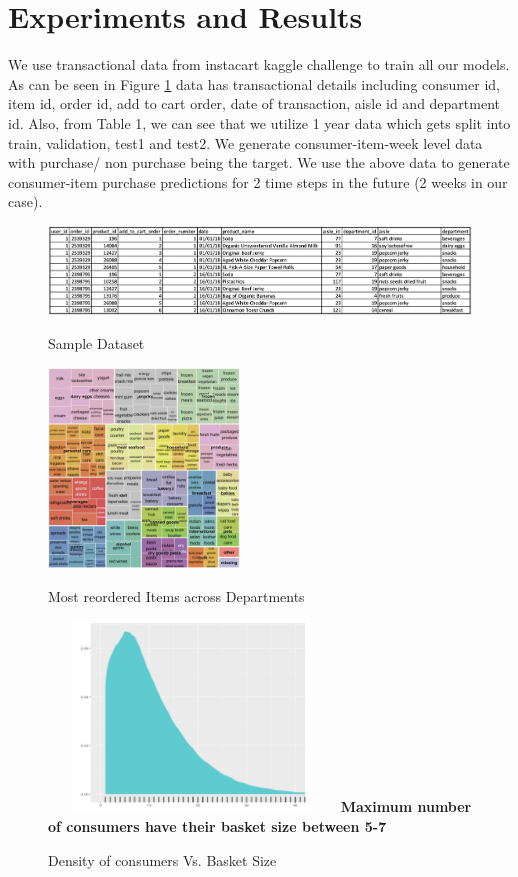 \section{Experiments and Results}
\label{sec:eval}
We use transactional data from instacart kaggle challenge to train all our models. As can 
be seen in Figure \ref{fig:sampledata} data has transactional details including consumer id, item id, 
order id, add to cart order, date of transaction, aisle id and department id.
Also, from Table 1, we can see that we utilize 1 year data which gets split into train, validation,
test1 and test2. We generate consumer-item-week level data with purchase/ non purchase being the target.
We use the above data to generate consumer-item purchase predictions for 2 time steps in the future (2 weeks in our case).
 \begin{figure}[!t]
    \centering 
    \caption{Sample Dataset} 
    \includegraphics[width=6.6in]{img/sampledata.png} 
    \label{fig:sampledata} 
  \end{figure}

  \begin{figure}[t]
    \centering 
    \caption{Most reordered Items across Departments} 
    \includegraphics[width=2in]{img/items.png} 
    \label{fig:items} 
  \end{figure}

  \begin{figure}[t]
    \centering 
    \caption{Density of consumers Vs. Basket Size} 
    \includegraphics[width=3in, height = 2in]{img/basket.png} 
    {\bf Maximum number of consumers have their basket size between 5-7}
    \label{fig:basket} 
  \end{figure}

